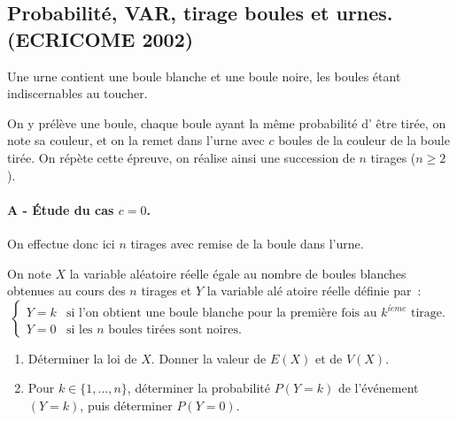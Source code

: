 
\subsection{Probabilité, VAR, tirage boules et urnes. (ECRICOME 2002) }
\begin{exercice}




Une urne contient une boule blanche et une boule noire, les boules \'etant
indiscernables au toucher.

On y pr\'el\`eve une boule, chaque boule ayant la m\^{e}me probabilit\'e d'%
\^{e}tre tir\'ee, on note sa couleur, et on la remet dans l'urne avec $c$
boules de la couleur de la boule tir\'ee. On r\'ep\`ete cette \'epreuve, on
r\'ealise ainsi une succession de $n$ tirages ($n\geqslant 2$).

\paragraph{\small{A - \'Etude du cas $c=0$.}\\}

On effectue donc ici $n$ tirages avec remise de la boule dans l'urne.

On note $X$ la variable al\'{e}atoire r\'{e}elle \'{e}gale au nombre de
boules blanches obtenues au cours des $n$ tirages et $Y$ la variable al\'{e}%
atoire r\'{e}elle d\'{e}finie par~: 
\begin{equation*}
\begin{cases}
Y=k & \text{si l'on obtient une boule blanche pour la premi\`{e}re fois au }%
k^{i\grave{e}me}\text{ tirage.} \\ 
Y=0 & \text{si les $n$ boules tir\'{e}es sont noires.}%
\end{cases}%
\end{equation*}

\begin{enumerate}
\item D\'{e}terminer la loi de $X$. Donner la valeur de $E(X)$ et de $V(X)$.

\item Pour $k\in \{1,\ldots ,n\}$, d\'{e}terminer la probabilit\'{e} $P(Y=k) 
$ de l'\'{e}v\'{e}nement $(Y=k)$, puis d\'{e}terminer $P(Y=0)$.


\end{enumerate}
\end{exercice}
